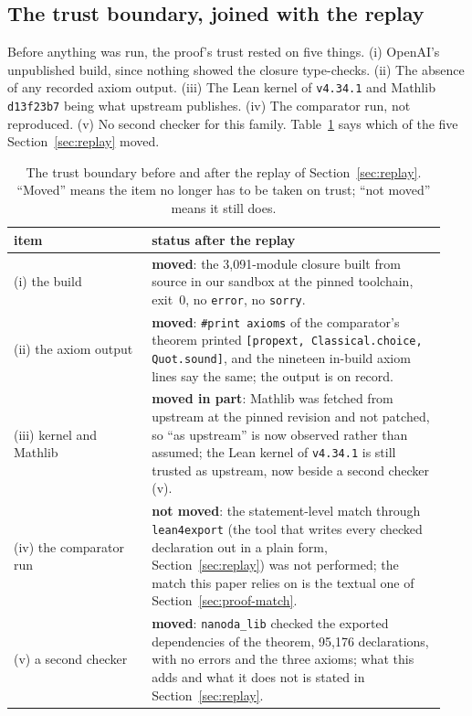 \subsection{The trust boundary, joined with the replay}
\label{sec:proof-trust}

Before anything was run, the proof's trust rested on five things.
(i) OpenAI's unpublished build, since nothing showed the closure
type-checks. (ii) The absence of any recorded axiom output. (iii) The
Lean kernel of \texttt{v4.34.1} and Mathlib \texttt{d13f23b7} being what
upstream publishes. (iv) The comparator run, not reproduced. (v) No
second checker for this family. Table~\ref{tab:proof-trust} says which
of the five Section~\ref{sec:replay} moved.

\begin{table}[t]
\centering\small
\caption{The trust boundary before and after the replay of
Section~\ref{sec:replay}. ``Moved'' means the item no longer has to be
taken on trust; ``not moved'' means it still does.}
\label{tab:proof-trust}
\begin{tabular}{@{}p{0.30\linewidth}p{0.64\linewidth}@{}}
\toprule
item & status after the replay \\
\midrule
(i) the build & \textbf{moved}: the 3,091-module closure built from source in our sandbox at the pinned toolchain, exit~0, no \texttt{error}, no \texttt{sorry}. \\
(ii) the axiom output & \textbf{moved}: \texttt{\#print axioms} of the comparator's theorem printed \texttt{[propext, Classical.choice, Quot.sound]}, and the nineteen in-build axiom lines say the same; the output is on record. \\
(iii) kernel and Mathlib & \textbf{moved in part}: Mathlib was fetched from upstream at the pinned revision and not patched, so ``as upstream'' is now observed rather than assumed; the Lean kernel of \texttt{v4.34.1} is still trusted as upstream, now beside a second checker (v). \\
(iv) the comparator run & \textbf{not moved}: the statement-level match through \texttt{lean4export} (the tool that writes every checked declaration out in a plain form, Section~\ref{sec:replay}) was not performed; the match this paper relies on is the textual one of Section~\ref{sec:proof-match}. \\
(v) a second checker & \textbf{moved}: \texttt{nanoda\_lib} checked the exported dependencies of the theorem, 95,176 declarations, with no errors and the three axioms; what this adds and what it does not is stated in Section~\ref{sec:replay}. \\
\bottomrule
\end{tabular}
\end{table}

